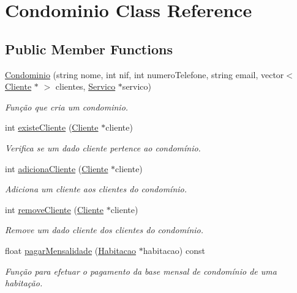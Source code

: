 \hypertarget{class_condominio}{}\section{Condominio Class Reference}
\label{class_condominio}
\subsection*{Public Member Functions}
\begin{DoxyCompactItemize}
\item 
\hyperlink{class_condominio_a3d835c6017cd8020d49bf550246bdca6}{Condominio} (string nome, int nif, int numero\+Telefone, string email, vector$<$ \hyperlink{class_cliente}{Cliente} $\ast$ $>$ clientes, \hyperlink{class_servico}{Servico} $\ast$servico)
\begin{DoxyCompactList}\small\item\em Função que cria um condominio. \end{DoxyCompactList}\item 
int \hyperlink{class_condominio_a08e2bf58344131ff357f2f7ed62a56fb}{existe\+Cliente} (\hyperlink{class_cliente}{Cliente} $\ast$cliente)
\begin{DoxyCompactList}\small\item\em Verifica se um dado cliente pertence ao condomínio. \end{DoxyCompactList}\item 
int \hyperlink{class_condominio_ae27a8bd9f2e1ad20b18dd34b4bd997d6}{adiciona\+Cliente} (\hyperlink{class_cliente}{Cliente} $\ast$cliente)
\begin{DoxyCompactList}\small\item\em Adiciona um cliente aos clientes do condomínio. \end{DoxyCompactList}\item 
int \hyperlink{class_condominio_ac62185f435dd9c3538a795aa7908beac}{remove\+Cliente} (\hyperlink{class_cliente}{Cliente} $\ast$cliente)
\begin{DoxyCompactList}\small\item\em Remove um dado cliente dos clientes do condomínio. \end{DoxyCompactList}\item 
float \hyperlink{class_condominio_a16747ea7d4e1b442b1985725f5a9aeab}{pagar\+Mensalidade} (\hyperlink{class_habitacao}{Habitacao} $\ast$habitacao) const 
\begin{DoxyCompactList}\small\item\em Função para efetuar o pagamento da base mensal de condomínio de uma habitação. \end{DoxyCompactList}\item 

\end{DoxyCompactItemize}
